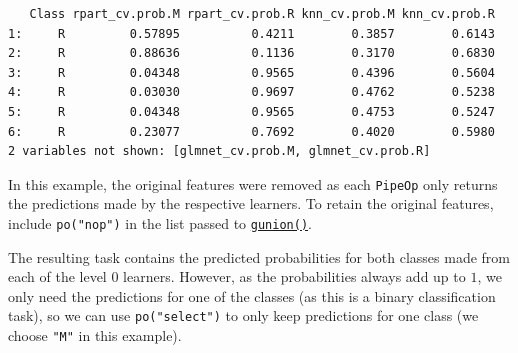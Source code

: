 \begin{verbatim}
   Class rpart_cv.prob.M rpart_cv.prob.R knn_cv.prob.M knn_cv.prob.R
1:     R         0.57895          0.4211        0.3857        0.6143
2:     R         0.88636          0.1136        0.3170        0.6830
3:     R         0.04348          0.9565        0.4396        0.5604
4:     R         0.03030          0.9697        0.4762        0.5238
5:     R         0.04348          0.9565        0.4753        0.5247
6:     R         0.23077          0.7692        0.4020        0.5980
2 variables not shown: [glmnet_cv.prob.M, glmnet_cv.prob.R]
\end{verbatim}

\begin{tcolorbox}[enhanced jigsaw, opacitybacktitle=0.6, rightrule=.15mm, opacityback=0, arc=.35mm, breakable, titlerule=0mm, colframe=quarto-callout-tip-color-frame, coltitle=black, bottomrule=.15mm, toprule=.15mm, colback=white, colbacktitle=quarto-callout-tip-color!10!white, bottomtitle=1mm, toptitle=1mm, title=\textcolor{quarto-callout-tip-color}{\faLightbulb}\hspace{0.5em}{Retaining Features}, leftrule=.75mm, left=2mm]

In this example, the original features were removed as each
\texttt{PipeOp} only returns the predictions made by the respective
learners. To retain the original features, include \texttt{po("nop")} in
the list passed to
\href{https://mlr3pipelines.mlr-org.com/reference/gunion.html}{\texttt{gunion()}}.

\end{tcolorbox}

The resulting task contains the predicted probabilities for both classes
made from each of the level 0 learners. However, as the probabilities
always add up to \(1\), we only need the predictions for one of the
classes (as this is a binary classification task), so we can use
\texttt{po("select")} to only keep predictions for one class (we choose
\texttt{"M"} in this example).

\begin{Shaded}
\begin{Highlighting}[]
\OtherTok{=}\SpecialCharTok{\%\textgreater{}\textgreater{}\%}
  \NormalTok{(}\NormalTok{, } \NormalTok{(}\SpecialCharTok{\textbackslash{}\textbackslash{}}\NormalTok{))}
\end{Highlighting}
\end{Shaded}

